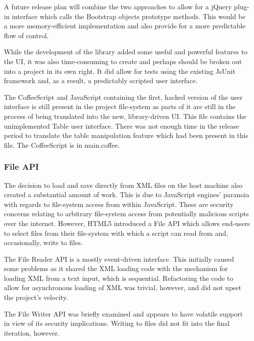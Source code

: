 A future release plan will combine the two approaches to allow for a jQuery plug-in interface which calls the Bootstrap objects prototype methods. This would be a more memory-efficient implementation and also provide for a more predictable flow of control.

While the development of the library added some useful and powerful features to the UI, it was also time-consuming to create and perhaps should be broken out into a project in its own right. It did allow for tests using the existing JsUnit framework and, as a result, a predictably scripted user interface.

The Coffee\-Script and Java\-Script containing the first, hacked version of the user interface is still present in the project file-system as parts of it are still in the process of being translated into the new, library-driven UI. This file contains the unimplemented Table user interface. There was not enough time in the release period to translate the table manipulation feature which had been present in this file. The Coffee\-Script is in main.coffee.

\subsubsection{File API}
The decision to load and save directly from XML files on the host machine also created a substantial amount of work. This is due to Java\-Script engines' paranoia with regards to file-system access from within Java\-Script. These are security concerns relating to arbitrary file-system access from potentially malicious scripts over the internet. However, HTML5 introduced a File API which allows end-users to select files from their file-system with which a script can read from and, occasionally, write to files.

The File Reader API is a mostly event-driven interface. This initially caused some problems as it shared the XML loading code with the mechanism for loading XML from a text input, which is sequential. Refactoring the code to allow for asynchronous loading of XML was trivial, however, and did not upset the project's velocity.

The File Writer API was briefly examined and appears to have volatile support in view of its security implications. Writing to files did not fit into the final iteration, however.